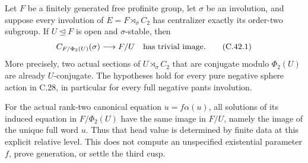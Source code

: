 Let $F$ be a finitely generated free profinite group, let $\sigma$
be an involution, and suppose every involution of
$E=F\rtimes_\sigma C_2$ has centralizer exactly its order-two
subgroup. If $U\trianglelefteq F$ is open and $\sigma$-stable, then
\[
 C_{F/\Phi_2(U)}(\sigma)\longrightarrow F/U
                    \quad\hbox{has trivial image}.              \tag{C.42.1}
\]
More precisely, two actual sections of $U\rtimes_\sigma C_2$
that are conjugate modulo $\Phi_2(U)$ are already $U$-conjugate.
The hypotheses hold for every pure negative sphere action in
C.28, in particular for every full negative pants involution.

For the actual rank-two canonical equation $u=f\alpha(u)$,
all solutions of its induced equation in $F/\Phi_2(U)$ have the
same image in $F/U$, namely the image of the unique full word $u$.
Thus that head value is determined by finite data at this explicit
relative level. This does not compute an unspecified existential
parameter $f$, prove generation, or settle the third cusp.

